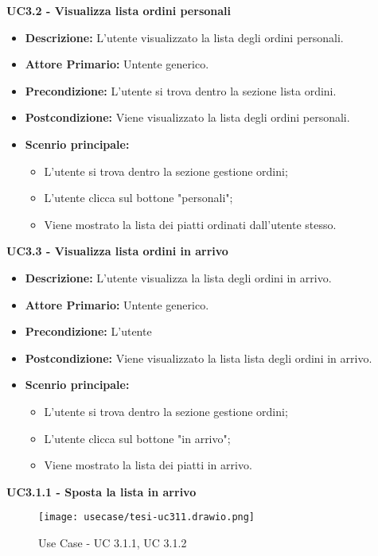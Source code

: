 \textbf{UC3.2 - Visualizza lista ordini personali}
\begin{itemize}
    \item \textbf{Descrizione:} L'utente visualizzato la lista degli ordini personali.
    \item \textbf{Attore Primario:} Untente generico.
    \item \textbf{Precondizione:} L'utente si trova dentro la sezione lista ordini.
    \item \textbf{Postcondizione:} Viene visualizzato la lista degli ordini personali.
    \item \textbf{Scenrio principale:}
    \begin{itemize}
        \item L'utente si trova dentro la sezione gestione ordini;
        \item L'utente clicca sul bottone "personali";
        \item Viene mostrato la lista dei piatti ordinati dall'utente stesso.
    \end{itemize}
\end{itemize}
\textbf{UC3.3 - Visualizza lista ordini in arrivo}
\begin{itemize}
    \item \textbf{Descrizione:} L'utente visualizza la lista degli ordini in arrivo.
    \item \textbf{Attore Primario:} Untente generico.
    \item \textbf{Precondizione:} L'utente 
    \item \textbf{Postcondizione:} Viene visualizzato la lista lista degli ordini in arrivo.
    \item \textbf{Scenrio principale:}
    \begin{itemize}
        \item L'utente si trova dentro la sezione gestione ordini;
        \item L'utente clicca sul bottone "in arrivo";
        \item Viene mostrato la lista dei piatti in arrivo.
    \end{itemize}
\end{itemize}
\textbf{UC3.1.1 - Sposta la lista in arrivo}
\begin{figure}[H]
    \centering
    \texttt{[image: usecase/tesi-uc311.drawio.png]}
    \caption{Use Case - UC 3.1.1, UC 3.1.2}
\end{figure}
